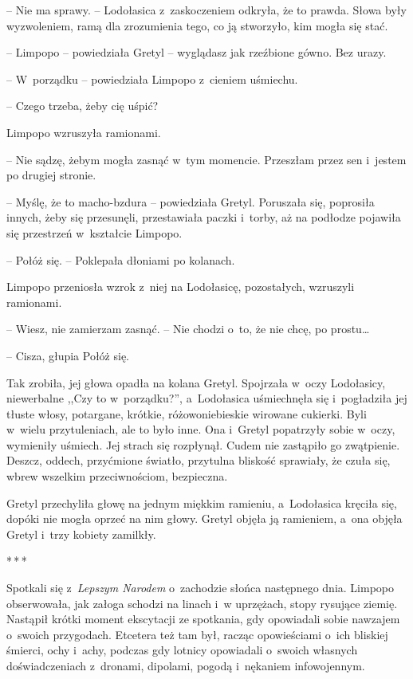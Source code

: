 \documentclass[oneside,polish,11pt,sfheadings]{mwbk}
\newcommand{\threeast}{\bigskip\par\centerline{*\,*\,*}\medskip\par}
\begin{document}
-- Nie ma sprawy. -- Lodołasica z~zaskoczeniem odkryła, że to prawda.
Słowa były wyzwoleniem, ramą dla zrozumienia tego, co ją stworzyło, kim
mogła się stać.

-- Limpopo -- powiedziała Gretyl -- wyglądasz jak rzeźbione gówno. Bez
urazy.

-- W~porządku -- powiedziała Limpopo z~cieniem uśmiechu.

-- Czego trzeba, żeby cię uśpić?

Limpopo wzruszyła ramionami. 

-- Nie sądzę, żebym mogła zasnąć w~tym
momencie. Przeszłam przez sen i~jestem po drugiej stronie.

-- Myślę, że to macho-bzdura -- powiedziała Gretyl. Poruszała się,
poprosiła innych, żeby się przesunęli, przestawiała paczki i~torby, aż
na podłodze pojawiła się przestrzeń w~kształcie Limpopo. 

-- Połóż się. -- Poklepała dłoniami po kolanach.

Limpopo przeniosła wzrok z~niej na Lodołasicę, pozostałych, wzruszyli
ramionami. 

-- Wiesz, nie zamierzam zasnąć. -- Nie chodzi o~to, że nie
chcę, po prostu\ldots 

-- Cisza, głupia Połóż się.

Tak zrobiła, jej głowa opadła na kolana Gretyl. Spojrzała w~oczy
Lodołasicy, niewerbalne ,,Czy to w~porządku?'', a~Lodołasica uśmiechnęła
się i~pogładziła jej tłuste włosy, potargane, krótkie, różowo\dywiz niebieskie
wirowane cukierki. Byli w~wielu przytuleniach, ale to było inne. Ona i~Gretyl popatrzyły sobie w~oczy, wymieniły uśmiech. Jej strach się
rozpłynął. Cudem nie zastąpiło go zwątpienie. Deszcz, oddech, przyćmione
światło, przytulna bliskość sprawiały, że czuła się, wbrew wszelkim
przeciwnościom, bezpieczna.

Gretyl przechyliła głowę na jednym miękkim ramieniu, a~Lodołasica
kręciła się, dopóki nie mogła oprzeć na nim głowy. Gretyl objęła ją
ramieniem, a~ona objęła Gretyl i~trzy kobiety zamilkły.

\threeast

Spotkali się z~\textit{Lepszym Narodem} o~zachodzie słońca następnego
dnia. Limpopo obserwowała, jak załoga schodzi na linach i~w uprzężach,
stopy rysujące ziemię. Nastąpił krótki moment ekscytacji ze spotkania,
gdy opowiadali sobie nawzajem o~swoich przygodach. Etcetera też tam był,
racząc opowieściami o~ich bliskiej śmierci, ochy i~achy, podczas gdy
lotnicy opowiadali o~swoich własnych doświadczeniach z~dronami,
dipolami, pogodą i~nękaniem infowojennym.
\end{document}
